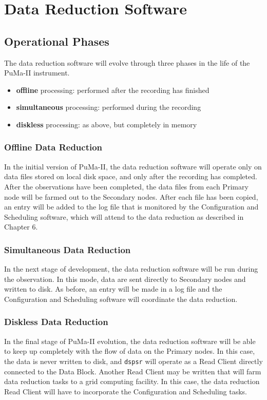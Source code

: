 \chapter{Data Reduction Software}

\section{Operational Phases}

The data reduction software will evolve through three phases in the life
of the PuMa-II instrument.

\begin{itemize}
\item {\bf offline} processing: performed after the recording has finished
\item {\bf simultaneous} processing: performed during the recording
\item {\bf diskless} processing: as above, but completely in memory
\end{itemize}

\subsection{Offline Data Reduction}

In the initial version of PuMa-II, the data reduction software will
operate only on data files stored on local disk space, and only after
the recording has completed.  After the observations have been
completed, the data files from each Primary node will be farmed out to
the Secondary nodes.  After each file has been copied, an entry will
be added to the log file that is monitored by the Configuration and
Scheduling software, which will attend to the data reduction as
described in Chapter 6.

\subsection{Simultaneous Data Reduction}

In the next stage of development, the data reduction software will be
run during the observation.  In this mode, data are sent directly to
Secondary nodes and written to disk.  As before, an entry will be made
in a log file and the Configuration and Scheduling software will
coordinate the data reduction.

\subsection{Diskless Data Reduction}

In the final stage of PuMa-II evolution, the data reduction software
will be able to keep up completely with the flow of data on the
Primary nodes.  In this case, the data is never written to disk, and
{\tt dspsr} will operate as a Read Client directly connected to the
Data Block.  Another Read Client may be written that will farm data
reduction tasks to a grid computing facility.  In this case, the data
reduction Read Client will have to incorporate the Configuration and
Scheduling tasks.

